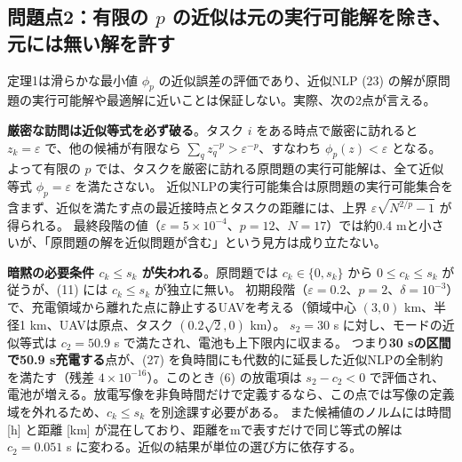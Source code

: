 \documentclass[uplatex,dvipdfmx,a4paper,11pt,jafont=haranoaji]{bxjsarticle}
\newcommand{\answerpart}[1]{\par\Needspace{6\baselineskip}\subsection*{#1}}
\begin{document}
\answerpart{問題点2：有限の \texorpdfstring{$p$}{p} の近似は元の実行可能解を除き、元には無い解を許す}
定理1は滑らかな最小値 $\phi_p$ の近似誤差の評価であり、近似NLP (23) の解が原問題の実行可能解や最適解に近いことは保証しない。実際、次の2点が言える。

\textbf{厳密な訪問は近似等式を必ず破る}。タスク $i$ をある時点で厳密に訪れると $z_k=\varepsilon$ で、他の候補が有限なら
$\sum_qz_q^{-p}>\varepsilon^{-p}$、すなわち $\phi_p(z)<\varepsilon$ となる。
よって有限の $p$ では、タスクを厳密に訪れる原問題の実行可能解は、全て近似等式 $\phi_p=\varepsilon$ を満たさない。
近似NLPの実行可能集合は原問題の実行可能集合を含まず、近似を満たす点の最近接時点とタスクの距離には、上界 $\varepsilon\sqrt{N^{2/p}-1}$ が得られる。
最終段階の値（$\varepsilon=5\times10^{-4}$、$p=12$、$N=17$）では約0.4 mと小さいが、「原問題の解を近似問題が含む」という見方は成り立たない。

\textbf{暗黙の必要条件 $c_k\le s_k$ が失われる}。原問題では $c_k\in\{0,s_k\}$ から $0\le c_k\le s_k$ が従うが、(11) には $c_k\le s_k$ が独立に無い。
初期段階（$\varepsilon=0.2$、$p=2$、$\delta=10^{-3}$）で、充電領域から離れた点に静止するUAVを考える（領域中心 $(3,0)$ km、半径1 km、UAVは原点、タスク $(0.2\sqrt2,0)$ km）。
$s_2=30$ s に対し、モードの近似等式は $c_2=50.9$ s で満たされ、電池も上下限内に収まる。
つまり\textbf{30 sの区間で50.9 s充電する}点が、(27) を負時間にも代数的に延長した近似NLPの全制約を満たす（残差 $4\times10^{-16}$）。このとき (6) の放電項は $s_2-c_2<0$ で評価され、電池が増える。放電写像を非負時間だけで定義するなら、この点では写像の定義域を外れるため、$c_k\le s_k$ を別途課す必要がある。
また候補値のノルムには時間 [h] と距離 [km] が混在しており、距離をmで表すだけで同じ等式の解は $c_2=0.051$ s に変わる。近似の結果が単位の選び方に依存する。
\end{document}
